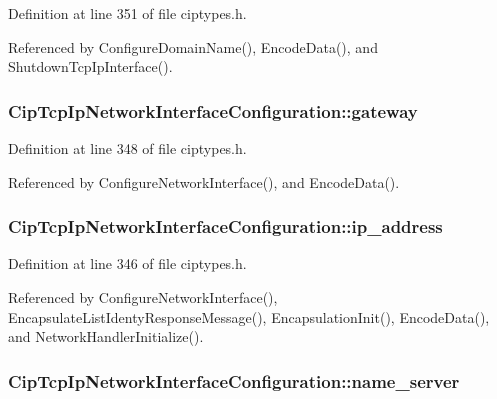 \-Definition at line 351 of file ciptypes.\-h.



\-Referenced by \-Configure\-Domain\-Name(), \-Encode\-Data(), and \-Shutdown\-Tcp\-Ip\-Interface().

\hypertarget{structCipTcpIpNetworkInterfaceConfiguration_a57d4e982c2b983e2b776316105a4b3a9}{
\subsubsection[{gateway}]{ {\bf \-Cip\-Tcp\-Ip\-Network\-Interface\-Configuration\-::gateway}}}\label{d0/d4c/structCipTcpIpNetworkInterfaceConfiguration_a57d4e982c2b983e2b776316105a4b3a9}


\-Definition at line 348 of file ciptypes.\-h.



\-Referenced by \-Configure\-Network\-Interface(), and \-Encode\-Data().

\hypertarget{structCipTcpIpNetworkInterfaceConfiguration_a2c56d6d4982484316a97630d7f1a4c95}{
\subsubsection[{ip\-\_\-address}]{ {\bf \-Cip\-Tcp\-Ip\-Network\-Interface\-Configuration\-::ip\-\_\-address}}}\label{d0/d4c/structCipTcpIpNetworkInterfaceConfiguration_a2c56d6d4982484316a97630d7f1a4c95}


\-Definition at line 346 of file ciptypes.\-h.



\-Referenced by \-Configure\-Network\-Interface(), \-Encapsulate\-List\-Identy\-Response\-Message(), \-Encapsulation\-Init(), \-Encode\-Data(), and \-Network\-Handler\-Initialize().

\hypertarget{structCipTcpIpNetworkInterfaceConfiguration_a82ed2612d25c04a1191b1d3582999584}{
\subsubsection[{name\-\_\-server}]{ {\bf \-Cip\-Tcp\-Ip\-Network\-Interface\-Configuration\-::name\-\_\-server}}}\label{d0/d4c/structCipTcpIpNetworkInterfaceConfiguration_a82ed2612d25c04a1191b1d3582999584}


